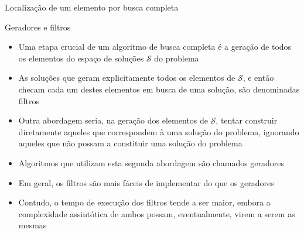 \begin{frame}[fragile]{Localização de um elemento por busca completa}
\end{frame}

\begin{frame}[fragile]{Geradores e filtros}

    \begin{itemize}
        \item Uma etapa crucial de um algoritmo de busca completa é a geração de todos os elementos
            do espaço de soluções $\mathcal{S}$ do problema

        \item As soluções que geram explicitamente todos os elementos de $\mathcal{S}$, e 
            então checam
            cada um destes elementos em busca de uma solução, são denominadas filtros

        \item Outra abordagem seria, na geração dos elementos de $\mathcal{S}$, tentar construir diretamente
            aqueles que correspondem à uma solução do problema, ignorando aqueles que não
            possam a constituir uma solução do problema

        \item Algoritmos que utilizam esta segunda abordagem são chamados geradores

        \item Em geral, os filtros são mais fáceis de implementar do que os geradores

        \item Contudo, o tempo de execução dos filtros tende a ser maior, embora a complexidade
            assintótica de ambos possam, eventualmente, virem a serem as mesmas
    \end{itemize}

\end{frame}

